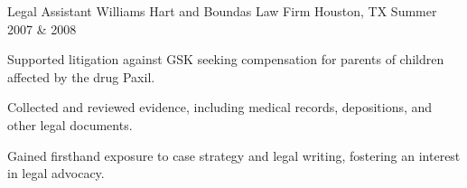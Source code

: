 \begin{cventries}
    \cventry
        {Legal Assistant} %
        {Williams Hart and Boundas Law Firm} %
        {Houston, TX} %
        {Summer 2007 \& 2008} %
        {
        \begin{cvitems} %
            \item {Supported litigation against GSK seeking compensation for parents of children affected by the drug Paxil.}
            \item {Collected and reviewed evidence, including medical records, depositions, and other legal documents.}
            \item {Gained firsthand exposure to case strategy and legal writing, fostering an interest in legal advocacy.}
        \end{cvitems}
        }



\end{cventries}
